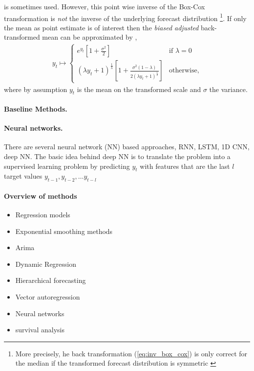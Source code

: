 \documentclass[12pt,a4paper]{article}
\begin{document}
\begin{itemize}
	is sometimes used. However, this point wise inverse of the Box-Cox transformation is \textit{not} the inverse of the underlying forecast distribution \footnote{More precisely, he back transformation (\ref{eq:inv_box_cox}) is only  correct for the median if the transformed forecast distribution is symmetric \cite{hyndman_forecasting_principles_2018}}. If only the mean as point estimate is of interest then the \textit{biased adjusted} back-transformed mean can be approximated by \cite{hyndman_blog_back_transform}, 
	\begin{align} \label{eq:inv_box_cox}
	y_t \mapsto 
	\begin{cases}
	e^{y_t}\left[1+\frac{\sigma^2}{2}\right] & \text{if } \lambda = 0\\ 
	(\lambda y_t + 1)^ \frac{1}{\lambda} \left[1+\frac{\sigma^2(1-\lambda)}{2(\lambda y_t + 1)^ \frac{1}{2} }\right] & \text{otherwise,}
	\end{cases}	
	\end{align}
	where by assumption $y_t$ is the mean on the transformed scale and  $\sigma$ the variance.
	  
\end{itemize}

\paragraph{Baseline Methods.}
\paragraph{Neural networks.} There are several neural network (NN) based approaches, RNN, LSTM, 1D CNN, deep NN. The basic idea behind deep NN is to translate the problem into a supervised learning problem by predicting $y_t$ with features that are the last $l$ target values $y_{t-1}, y_{t-2},\dots y_{t-l}$ 
\paragraph{Overview of methods} 
\begin{itemize}
	\item Regression models
	\item Exponential smoothing methods
	\item Arima
	\item Dynamic Regression 
	\item Hierarchical forecasting
	\item Vector autoregression
	\item Neural networks
	\item survival analysis
\end{itemize}




\end{document}

